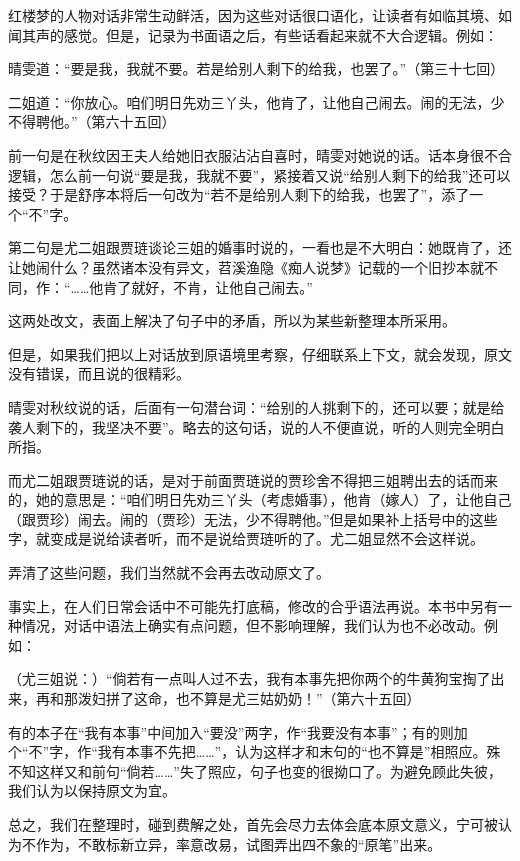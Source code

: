 红楼梦的人物对话非常生动鲜活，因为这些对话很口语化，让读者有如临其境、如闻其声的感觉。但是，记录为书面语之后，有些话看起来就不大合逻辑。例如：

晴雯道：``要是我，我就不要。若是给别人剩下的给我，也罢了。''（第三十七回）

二姐道：``你放心。咱们明日先劝三丫头，他肯了，让他自己闹去。闹的无法，少不得聘他。''（第六十五回）

前一句是在秋纹因王夫人给她旧衣服沾沾自喜时，晴雯对她说的话。话本身很不合逻辑，怎么前一句说``要是我，我就不要''，紧接着又说``给别人剩下的给我''还可以接受？于是舒序本将后一句改为``若{不}是给别人剩下的给我，也罢了''，添了一个``不''字。

第二句是尤二姐跟贾琏谈论三姐的婚事时说的，一看也是不大明白：她既肯了，还让她闹什么？虽然诸本没有异文，苕溪渔隐《痴人说梦》记载的一个旧抄本就不同，作：``\ldots{}\ldots{}他肯了{就好，不肯}，让他自己闹去。''

这两处改文，表面上解决了句子中的矛盾，所以为某些新整理本所采用。

但是，如果我们把以上对话放到原语境里考察，仔细联系上下文，就会发现，原文没有错误，而且说的很精彩。

晴雯对秋纹说的话，后面有一句潜台词：``给别的人挑剩下的，还可以要；就是给袭人剩下的，我坚决不要''。略去的这句话，说的人不便直说，听的人则完全明白所指。

而尤二姐跟贾琏说的话，是对于前面贾琏说的贾珍舍不得把三姐聘出去的话而来的，她的意思是：``咱们明日先劝三丫头（考虑婚事），他肯（嫁人）了，让他自己（跟贾珍）闹去。闹的（贾珍）无法，少不得聘他。''但是如果补上括号中的这些字，就变成是说给读者听，而不是说给贾琏听的了。尤二姐显然不会这样说。

弄清了这些问题，我们当然就不会再去改动原文了。

事实上，在人们日常会话中不可能先打底稿，修改的合乎语法再说。本书中另有一种情况，对话中语法上确实有点问题，但不影响理解，我们认为也不必改动。例如：

（尤三姐说：）``倘若有一点叫人过不去，我有本事先把你两个的牛黄狗宝掏了出来，再和那泼妇拼了这命，也不算是尤三姑奶奶！''（第六十五回）

有的本子在``我有本事''中间加入``要没''两字，作``我要没有本事''；有的则加个``不''字，作``我有本事不先把\ldots{}\ldots{}''，认为这样才和末句的``也不算是''相照应。殊不知这样又和前句``倘若\ldots{}\ldots{}''失了照应，句子也变的很拗口了。为避免顾此失彼，我们认为以保持原文为宜。

总之，我们在整理时，碰到费解之处，首先会尽力去体会底本原文意义，宁可被认为不作为，不敢标新立异，率意改易，试图弄出四不象的``原笔''出来。

